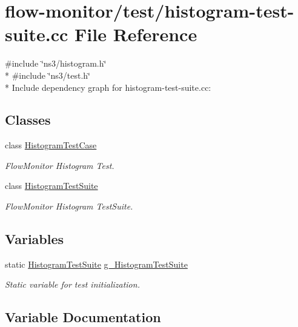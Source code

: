 \hypertarget{histogram-test-suite_8cc}{}\section{flow-\/monitor/test/histogram-\/test-\/suite.cc File Reference}
\label{histogram-test-suite_8cc}
{\ttfamily \#include \char`\"{}ns3/histogram.\+h\char`\"{}}\\*
{\ttfamily \#include \char`\"{}ns3/test.\+h\char`\"{}}\\*
Include dependency graph for histogram-\/test-\/suite.cc\+:
\subsection*{Classes}
\begin{DoxyCompactItemize}
\item 
class \hyperlink{classHistogramTestCase}{Histogram\+Test\+Case}
\begin{DoxyCompactList}\small\item\em Flow\+Monitor Histogram Test. \end{DoxyCompactList}\item 
class \hyperlink{classHistogramTestSuite}{Histogram\+Test\+Suite}
\begin{DoxyCompactList}\small\item\em Flow\+Monitor Histogram Test\+Suite. \end{DoxyCompactList}\end{DoxyCompactItemize}
\subsection*{Variables}
\begin{DoxyCompactItemize}
\item 
static \hyperlink{classHistogramTestSuite}{Histogram\+Test\+Suite} \hyperlink{histogram-test-suite_8cc_ac6a2db35425e4ea7d6576e90530d7f26}{g\+\_\+\+Histogram\+Test\+Suite}
\begin{DoxyCompactList}\small\item\em Static variable for test initialization. \end{DoxyCompactList}\end{DoxyCompactItemize}


\subsection{Variable Documentation}
